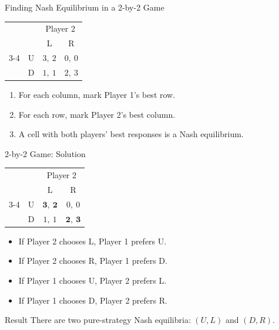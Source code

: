 \documentclass[10pt,aspectratio=169]{beamer}
\newcommand{\pay}[2]{#1,\ #2}
\begin{document}
\begin{frame}{Finding Nash Equilibrium in a 2-by-2 Game}
\begin{center}
\begin{tabular}{c c c c}
 & & \multicolumn{2}{c}{Player 2}\\
 & & L & R\\
\cmidrule{3-4}
\multirow{2}{*}{Player 1} & U & $\pay{3}{2}$ & $\pay{0}{0}$\\
 & D & $\pay{1}{1}$ & $\pay{2}{3}$\\
\end{tabular}
\end{center}
\vspace{0.2cm}
\begin{enumerate}
  \item For each column, mark Player 1's best row.
  \item For each row, mark Player 2's best column.
  \item A cell with both players' best responses is a Nash equilibrium.
\end{enumerate}
\end{frame}

\begin{frame}{2-by-2 Game: Solution}
\begin{center}
\begin{tabular}{c c c c}
 & & \multicolumn{2}{c}{Player 2}\\
 & & L & R\\
\cmidrule{3-4}
\multirow{2}{*}{Player 1} & U & $\pay{\mathbf{3}}{\mathbf{2}}$ & $\pay{0}{0}$\\
 & D & $\pay{1}{1}$ & $\pay{\mathbf{2}}{\mathbf{3}}$\\
\end{tabular}
\end{center}
\vspace{0.2cm}
\begin{itemize}
  \item If Player 2 chooses L, Player 1 prefers U.
  \item If Player 2 chooses R, Player 1 prefers D.
  \item If Player 1 chooses U, Player 2 prefers L.
  \item If Player 1 chooses D, Player 2 prefers R.
\end{itemize}
\begin{block}{Result}
There are two pure-strategy Nash equilibria: $(U,L)$ and $(D,R)$.
\end{block}
\end{frame}
\end{document}
